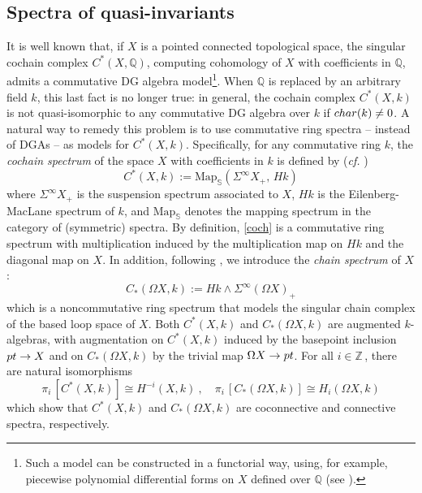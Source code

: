 \documentclass[11pt]{amsart}
\theoremstyle{definition}
\theoremstyle{remark}
\numberwithin{equation}{section}
\newcommand{\la}{\label}
\newcommand{\Map}{\mathrm{Map}}
\def\bS{\mathbb S}
\def\Z{\mathbb{Z}}
\def\Q{\mathbb{Q}}
\begin{document}
\subsection{Spectra of quasi-invariants}
\la{S7.2}
It is well known that, if $X$ is a pointed connected topological space, the singular cochain complex $ C^*(X, \Q) $, computing cohomology of $X$ with coefficients in $\Q$, admits a commutative DG algebra model\footnote{Such a model can be constructed in a functorial way, using, for example, piecewise polynomial differential forms on $X$ defined over $\Q$ (see \cite{BG76}).}. When $\Q$ is replaced by an arbitrary field $k$, this last fact is no longer true:  in general, the cochain complex $ C^*(X,k) $ is not quasi-isomorphic to any commutative DG algebra over $k$ if ${\rm char}(k) \not= 0 $. A natural way to remedy this problem is to use commutative ring spectra -- instead of DGAs -- as models for $C^*(X,k)$. Specifically, for any commutative ring $k$, the {\it cochain  spectrum} of the space $X$ with coefficients in $k$ is defined by
({\it cf.} \cite{Man01})
%
\begin{equation}
\la{coch}
C^*(X, k) := \Map_{\bS}(\Sigma^{\infty}X_+, \,Hk)    
\end{equation}
%
where $ \Sigma^\infty X_+$ is the suspension spectrum associated to $X$, $Hk$ is the Eilenberg-MacLane spectrum of $k$, and $\Map_{\bS}$ denotes the mapping spectrum in the category of (symmetric) spectra. By definition, \eqref{coch} is a commutative ring spectrum with multiplication induced by the multiplication map on $Hk$ and the diagonal map on $X$.
In addition, following \cite{DGI06}, we introduce the {\it chain spectrum} of $X$:
%
\begin{equation}
\la{chain}
C_*(\Omega X, k) := Hk \wedge \Sigma^{\infty}(\Omega X)_+
\end{equation}
%
which is a noncommutative ring spectrum that models the singular chain complex of the based loop space of $X$. Both $C^*(X,k)$ and $ C_*(\Omega X,k) $ are augmented $k$-algebras, with augmentation on $C^*(X,k) $ induced by the basepoint inclusion $ {\rm pt} \to X $ and on $ C_*(\Omega X, k)  $ by the trivial map $ \Omega X \to {\rm pt} $. For all $ i \in \Z\,$, there are natural isomorphisms
%
\begin{equation}
\la{isococh}
\pi_i\,[C^*(X,k)] \cong H^{-i}(X,k)\ ,\quad
\pi_i\,[C_*(\Omega X, k)] \cong H_i(\Omega X, k)
\end{equation}
%
which show that $ C^*(X,k) $ and $C_*(\Omega X, k) $ are coconnective and connective spectra, respectively.
\end{document}
